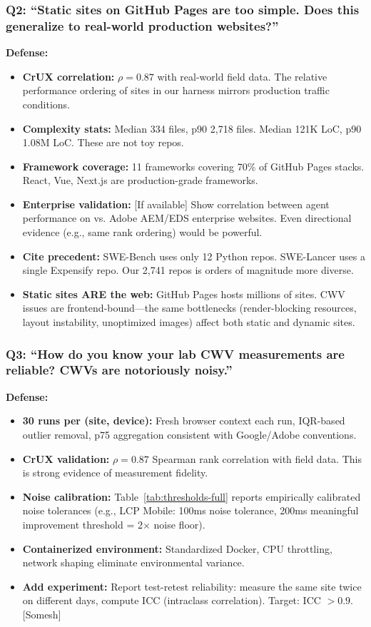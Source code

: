 \subsubsection{Q2: ``Static sites on GitHub Pages are too simple. Does this generalize to real-world production websites?''}
\textbf{Defense:}
\begin{itemize}
    \item \textbf{CrUX correlation:} $\rho = 0.87$ with real-world field data. The relative performance ordering of sites in our harness mirrors production traffic conditions.
    \item \textbf{Complexity stats:} Median 334 files, p90 2,718 files. Median 121K LoC, p90 1.08M LoC. These are not toy repos.
    \item \textbf{Framework coverage:} 11 frameworks covering 70\% of GitHub Pages stacks. React, Vue, Next.js are production-grade frameworks.
    \item \textbf{Enterprise validation:} [If available] Show correlation between agent performance on \OurBench vs. Adobe AEM/EDS enterprise websites. Even directional evidence (e.g., same rank ordering) would be powerful.
    \item \textbf{Cite precedent:} SWE-Bench uses only 12 Python repos. SWE-Lancer uses a single Expensify repo. Our 2,741 repos is orders of magnitude more diverse.
    \item \textbf{Static sites ARE the web:} GitHub Pages hosts millions of sites. CWV issues are frontend-bound---the same bottlenecks (render-blocking resources, layout instability, unoptimized images) affect both static and dynamic sites.
\end{itemize}

\subsubsection{Q3: ``How do you know your lab CWV measurements are reliable? CWVs are notoriously noisy.''}
\textbf{Defense:}
\begin{itemize}
    \item \textbf{30 runs per (site, device):} Fresh browser context each run, IQR-based outlier removal, p75 aggregation consistent with Google/Adobe conventions.
    \item \textbf{CrUX validation:} $\rho = 0.87$ Spearman rank correlation with field data. This is strong evidence of measurement fidelity.
    \item \textbf{Noise calibration:} Table~\ref{tab:thresholds-full} reports empirically calibrated noise tolerances (e.g., LCP Mobile: 100ms noise tolerance, 200ms meaningful improvement threshold = 2$\times$ noise floor).
    \item \textbf{Containerized environment:} Standardized Docker, CPU throttling, network shaping eliminate environmental variance.
    \item \textbf{Add experiment:} Report test-retest reliability: measure the same site twice on different days, compute ICC (intraclass correlation). Target: ICC $> 0.9$. [Somesh]
\end{itemize}

